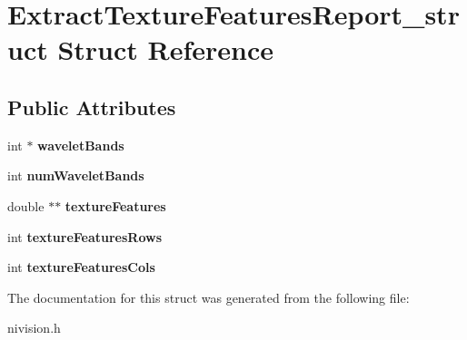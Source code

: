 \hypertarget{structExtractTextureFeaturesReport__struct}{
\section{ExtractTextureFeaturesReport\_\-struct Struct Reference}
\label{structExtractTextureFeaturesReport__struct}
}
\subsection*{Public Attributes}
\begin{DoxyCompactItemize}
\item 
\hypertarget{structExtractTextureFeaturesReport__struct_aef8d4fa3592fbd64134da93819c04430}{
int $\ast$ {\bfseries waveletBands}}
\label{structExtractTextureFeaturesReport__struct_aef8d4fa3592fbd64134da93819c04430}

\item 
\hypertarget{structExtractTextureFeaturesReport__struct_accca12307e084309809cf026a914adae}{
int {\bfseries numWaveletBands}}
\label{structExtractTextureFeaturesReport__struct_accca12307e084309809cf026a914adae}

\item 
\hypertarget{structExtractTextureFeaturesReport__struct_a127ab6541cc34a48e743720968fcbd17}{
double $\ast$$\ast$ {\bfseries textureFeatures}}
\label{structExtractTextureFeaturesReport__struct_a127ab6541cc34a48e743720968fcbd17}

\item 
\hypertarget{structExtractTextureFeaturesReport__struct_ac5651243c250131eb02ff8d194991fd0}{
int {\bfseries textureFeaturesRows}}
\label{structExtractTextureFeaturesReport__struct_ac5651243c250131eb02ff8d194991fd0}

\item 
\hypertarget{structExtractTextureFeaturesReport__struct_abc36fbaefe1d08c3b820c7c4664e543c}{
int {\bfseries textureFeaturesCols}}
\label{structExtractTextureFeaturesReport__struct_abc36fbaefe1d08c3b820c7c4664e543c}

\end{DoxyCompactItemize}


The documentation for this struct was generated from the following file:\begin{DoxyCompactItemize}
\item 
nivision.h\end{DoxyCompactItemize}

